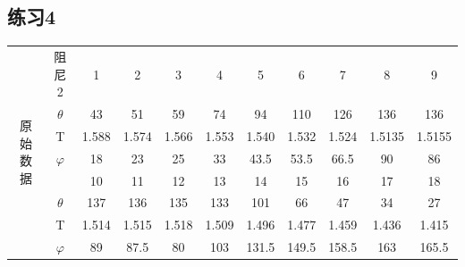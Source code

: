 \documentclass[UTF8]{ctexart}
\begin{document}
        \subsection{练习4}
        \begin{table}[!htbp]
            \centering
            \begin{tabular}{|c|c|c|c|c|c|c|c|c|c|c|}
            \hline
            \multirow{8}{*}{原始数据} & 阻尼2       & 1     & 2     & 3     & 4     & 5     & 6     & 7     & 8      & 9      \\ \cline{2-11}
                                  & $\theta$  & 43    & 51    & 59    & 74    & 94    & 110   & 126   & 136    & 136    \\ \cline{2-11}
                                  & T         & 1.588 & 1.574 & 1.566 & 1.553 & 1.540 & 1.532 & 1.524 & 1.5135 & 1.5155 \\ \cline{2-11}
                                  & $\varphi$ & 18    & 23    & 25    & 33    & 43.5  & 53.5  & 66.5  & 90     & 86     \\ \cline{2-11}
                                  &           & 10    & 11    & 12    & 13    & 14    & 15    & 16    & 17     & 18     \\ \cline{2-11}
                                  & $\theta$  & 137   & 136   & 135   & 133   & 101   & 66    & 47    & 34     & 27     \\ \cline{2-11}
                                  & T         & 1.514 & 1.515 & 1.518 & 1.509 & 1.496 & 1.477 & 1.459 & 1.436  & 1.415  \\ \cline{2-11}
                                  & $\varphi$ & 89    & 87.5  & 80    & 103   & 131.5 & 149.5 & 158.5 & 163    & 165.5  \\ \hline
            \end{tabular}
            \end{table}
\end{document}
